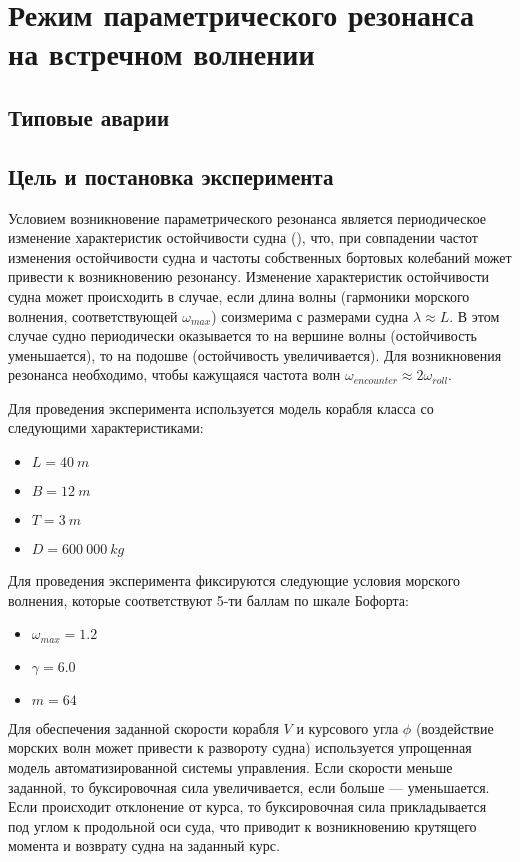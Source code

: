 \section{Режим параметрического резонанса на встречном волнении}

\subsection{Типовые аварии}


\subsection{Цель и постановка эксперимента}

Условием возникновение параметрического резонанса является периодическое изменение характеристик остойчивости судна (), что, при совпадении частот изменения остойчивости судна и частоты собственных бортовых колебаний может привести к возникновению резонансу.
Изменение характеристик остойчивости судна может происходить в случае, если длина волны (гармоники морского волнения, соответствующей $\omega_{max}$) соизмерима с размерами судна $\lambda \approx L$. В этом случае судно периодически оказывается то на вершине волны (остойчивость уменьшается), то на подошве (остойчивость увеличивается). Для возникновения резонанса необходимо, чтобы кажущаяся частота волн $\omega_{encounter} \approx 2\omega_{roll}$.

Для проведения эксперимента используется модель корабля класса  со следующими характеристиками:
\begin{itemize}
	\item	$L = 40\ m$
	\item	$B = 12\ m$
	\item	$T = 3\ m$
	\item	$D = 600\ 000\ kg$
\end{itemize}

Для проведения эксперимента фиксируются следующие условия морского волнения, которые соответствуют 5-ти баллам по шкале Бофорта:
\begin{itemize}
	\item	$\omega_{max} = 1.2$
	\item	$\gamma = 6.0$
	\item	$m = 64$
\end{itemize}

Для обеспечения заданной скорости корабля $V$ и курсового угла $\phi$ (воздействие морских волн может привести к развороту судна) используется упрощенная модель автоматизированной системы управления. Если скорости меньше заданной, то буксировочная сила увеличивается, если больше --- уменьшается. Если происходит отклонение от курса, то буксировочная сила прикладывается под углом к продольной оси суда, что приводит к возникновению крутящего момента и возврату судна на заданный курс.

